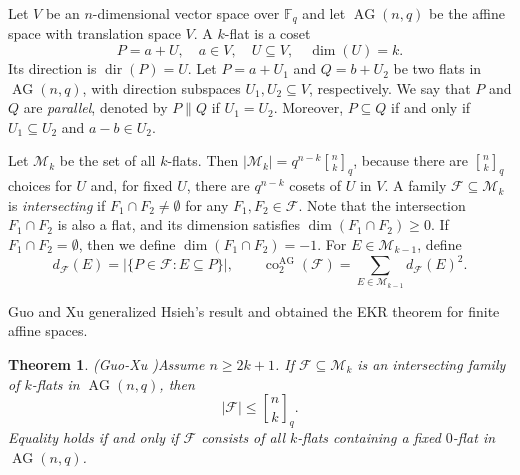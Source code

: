 \documentclass[11pt]{article}
\newtheorem{theorem}{Theorem}
\theoremstyle{definition}
\newcommand{\Fq}{\mathbb F_q}
\newcommand{\qbinom}[2]{\genfrac{[}{]}{0pt}{}{#1}{#2}_q}
\newcommand{\AG}{\operatorname{AG}}
\newcommand{\dir}{\operatorname{dir}}
\begin{document}
\vskip 2mm



Let $V$ be an $n$-dimensional vector space over $\Fq$ and let $\AG(n,q)$ be the affine space with translation space $V$.  A $k$-flat is a coset
\[
P=a+U,
\quad a\in V,
\quad U\subseteq V,
\quad \dim (U)=k.
\]
Its direction is $\dir(P)=U$. Let $P=a+U_1$ and $Q=b+U_2$ be two flats in $\AG(n,q)$, with direction subspaces $U_1, U_2\subseteq V$, respectively. We say that $P$ and $Q$ are \emph{parallel}, denoted by $P\parallel Q$ if $U_1=U_2$. Moreover, $P\subseteq Q$ if and only if $U_1\subseteq U_2$ and $a-b\in U_2$.
 
Let $\mathcal M_k$ be the set of all $k$-flats. Then $|\mathcal M_k|=q^{n-k}\qbinom{n}{k}$,
because there are $\qbinom{n}{k}$ choices for $U$ and, for fixed $U$, there are $q^{n-k}$ cosets of $U$ in $V$. A family $\mathcal{F}\subseteq {\mathcal M_k}$ is \emph{intersecting} if $F_1 \cap F_2 \neq \emptyset$ for any $F_1,F_2\in {\mathcal F}$. Note that the intersection $F_1 \cap F_2$ is also a flat, and its dimension satisfies $\dim(F_1 \cap F_2) \ge 0$. If $F_1 \cap F_2 = \emptyset$, then we define $\dim(F_1 \cap F_2)= -1$. For $E\in\mathcal M_{k-1}$, define
\[
d_{\mathcal F}(E)=|\{P\in\mathcal F:E\subseteq P\}|,
\qquad
\operatorname{co}^{\mathrm{AG}}_2(\mathcal F)=\sum_{E\in\mathcal M_{k-1}}d_{\mathcal F}(E)^2.
\]

Guo and Xu \cite{GuoXu2017} generalized Hsieh’s result and obtained
the EKR theorem for finite affine spaces.

\begin{theorem}(Guo-Xu \cite{GuoXu2017})\label{thm:guo-xu}
Assume $n\ge 2k+1$.  If $\mathcal F\subseteq\mathcal M_k$ is an intersecting family of $k$-flats in $\AG(n,q)$, then
\[
|\mathcal F|\le \qbinom{n}{k}.
\]
Equality holds if and only if $\mathcal{F}$ consists of all $k$-flats containing a fixed $0$-flat in $\AG(n,q)$.
\end{theorem}


\vskip 2mm
\end{document}
